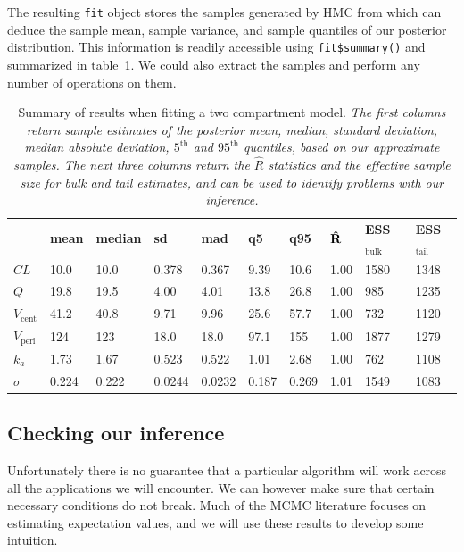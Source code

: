 The resulting \texttt{fit} object stores the samples generated by HMC from which can deduce the sample mean, sample variance, and sample quantiles of our posterior distribution.
This information is readily accessible using \texttt{fit\$summary()} and summarized in table~\ref{tab:summary}.
We could also extract the samples and perform any number of operations on them.

\begin{table}[!h]
  \renewcommand{\arraystretch}{1.5}
  \begin{tabular}{l l l l l l l l l l}
  \rowcolor[gray]{0.95} & \bf mean & \bf median & \bf sd & \bf mad & \bf q5 & \bf q95 & $\bf \hat R$ & \bf ESS$_\mathrm{bulk}$ & \bf ESS$_\mathrm{tail}$ \\
$CL$    &    10.0  &  10.0  &  0.378  & 0.367 &  9.39 &  10.6  &  1.00   & 1580  &  1348 \\
\rowcolor[gray]{0.95} $Q$      &  19.8    & 19.5  &  4.00  &  4.01 &  13.8  &   26.8 &   1.00  &   985 &    1235 \\
$V_\mathrm{cent}$   &   41.2  &  40.8 &   9.71   & 9.96  & 25.6 &   57.7   & 1.00   &  732  &  1120 \\
\rowcolor[gray]{0.95} $V_\mathrm{peri}$    &  124 &   123 &    18.0  &  18.0 &    97.1 &  155 &   1.00  &  1877 &    1279 \\
$k_a$       &  1.73   & 1.67 &  0.523  & 0.522   & 1.01 &   2.68 &   1.00   &  762 &    1108 \\
\rowcolor[gray]{0.95} $\sigma$   & 0.224 &   0.222 &  0.0244 &  0.0232 &  0.187 &   0.269 &  1.01  & 1549 &   1083
  \end{tabular}
  \caption{Summary of results when fitting a two compartment model. \textit{The first columns return sample estimates of the posterior mean, median, standard deviation, median absolute deviation, $5^\mathrm{th}$ and $95^\mathrm{th}$ quantiles, based on our approximate samples.
  The next three columns return the $\hat R$ statistics and the effective sample size for bulk and tail estimates, and can be used to identify problems with our inference.}}
  \label{tab:summary}
\end{table}

\subsection{Checking our inference}

Unfortunately there is no guarantee that a particular algorithm will work across all the applications we will encounter.
We can however make sure that certain necessary conditions do not break.
Much of the MCMC literature focuses on estimating expectation values, and we will use these results to develop some intuition.

